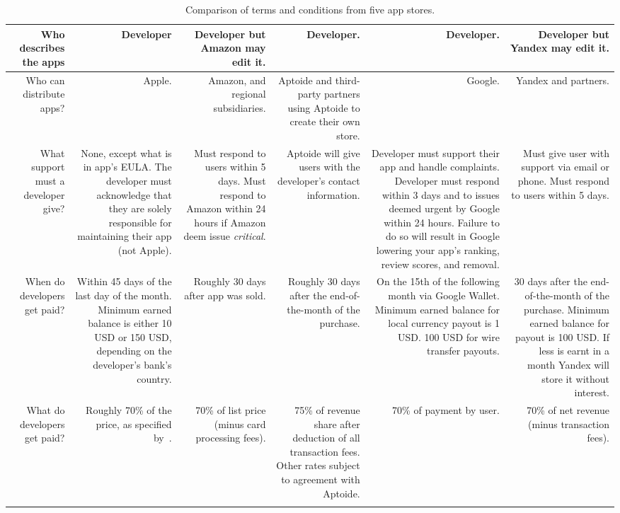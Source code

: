 \documentclass[thesis.tex]{subfiles}
\begin{document}
{{\begin{longtable}{RRRRRR}
    Who describes the apps
 & Developer
 & Developer but Amazon may edit it.
 & Developer.
 & Developer.
 & Developer but Yandex may edit it.
                                              \\\midrule
    Who can distribute apps?
 & Apple.
 & Amazon, and regional subsidiaries.
 & Aptoide and third-party partners using Aptoide to create their own store.
 & Google.
 & Yandex and partners.
                                              \\\midrule
    What support must a developer give?
 & None, except what is in app's EULA.  The developer must acknowledge that they are solely responsible for maintaining their app (not Apple).
 & Must respond to users within 5 days.  Must respond to Amazon within 24 hours if Amazon deem issue \emph{critical}.
 & Aptoide will give users with the developer's contact information.
 & Developer must support their app and handle complaints.  Developer must respond within 3 days and to issues deemed urgent by Google within 24 hours.  Failure to do so will result in Google lowering your app's ranking, review scores, and removal.
 & Must give user with support via email or phone.  Must respond to users within 5 days.
                                              \\\midrule
    When do developers get paid?
 & Within 45 days of the last day of the month.  Minimum earned balance is either 10 USD or 150 USD, depending on the developer's bank's country.
 & Roughly 30 days after app was sold.
 & Roughly 30 days after the end-of-the-month of the purchase.
 & On the 15th of the following month via Google Wallet.  Minimum earned balance for local currency payout is 1 USD. 100 USD for wire transfer payouts.
 & 30 days after the end-of-the-month of the purchase.  Minimum earned balance for payout is 100 USD.  If less is earnt in a month Yandex will store it without interest.
                                              \\\midrule
    What do developers get paid?
 & Roughly 70\% of the price, as specified by~\cite{apple_itunes_2017}.
 & 70\% of list price (minus card processing fees).
 & 75\% of revenue share after deduction of all transaction fees.  Other rates subject to agreement with Aptoide.
 & 70\% of payment by user.
 & 70\% of net revenue (minus transaction fees).
                                              \\
    \bottomrule
    \caption{Comparison of terms and conditions from five app stores.}
    \label{tab:terms-and-conditions}
  \end{longtable}
}}
\end{document}
